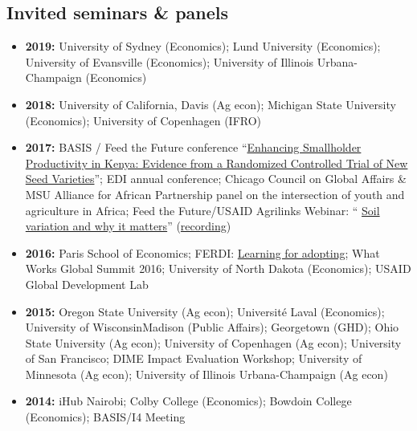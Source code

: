 \documentclass[11pt]{article}
\begin{document}
\subsection*{\sc Invited seminars \& panels}
\begin{itemize}[itemsep=.9pt, leftmargin=20pt]
    \item[]\textbf{2019:} University of Sydney (Economics); Lund University (Economics); University of Evansville (Economics); University of Illinois Urbana-Champaign (Economics)
    \item[]\textbf{2018:} University of California, Davis (Ag econ); Michigan State University (Economics); University of Copenhagen (IFRO)
    \item[]\textbf{2017:} BASIS / Feed the Future conference ``\href{https://basis.ucdavis.edu/past-event/enhancing-smallholder-productivity-kenya-evidence-randomized-controlled-trial-new-seed}{Enhancing Smallholder Productivity in Kenya: Evidence from a Randomized Controlled Trial of New Seed Varieties}''; EDI annual conference; Chicago Council on Global Affairs \& MSU Alliance for African Partnership panel on the intersection of youth and agriculture in Africa; Feed the Future/USAID Agrilinks Webinar: `` \href{http://Soil variation and why it matters}{Soil variation and why it matters}'' (\href{https://www.youtube.com/watch?v=XKBpPuR8P4Q}{recording}) 
    \item[]\textbf{2016:} Paris School of Economics; FERDI: \href{http://www.ferdi.fr/en/event/agricultural-innovation-learning-adopting}{Learning for adopting}; What Works Global Summit 2016; University of North Dakota (Economics); USAID Global Development Lab
    \item[]\textbf{2015:} Oregon State University (Ag econ); Universit\'{e} Laval (Economics); University of Wisconsin\textendash Madison (Public Affairs); Georgetown (GHD); Ohio State University (Ag econ); University of Copenhagen (Ag econ); University of San Francisco; DIME Impact Evaluation Workshop; University of Minnesota (Ag econ); University of Illinois Urbana-Champaign (Ag econ)
    \item[]\textbf{2014:} iHub Nairobi; Colby College (Economics); Bowdoin College (Economics); BASIS/I4 Meeting
\end{itemize}
\end{document}
